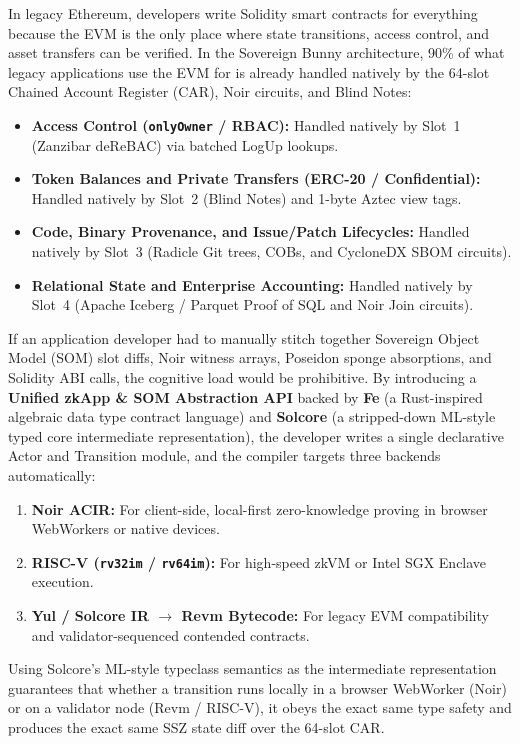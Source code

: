 \documentclass[a4paper,11pt,twoside,parskip=half-,headings=small]{scrartcl}
\newcommand{\code}[1]{\texttt{#1}}
\begin{document}
In legacy Ethereum, developers write Solidity smart contracts for everything because the EVM is the only place where state transitions, access control, and asset transfers can be verified. In the Sovereign Bunny architecture, 90\% of what legacy applications use the EVM for is already handled natively by the 64-slot Chained Account Register (CAR), Noir circuits, and Blind Notes:
\begin{itemize}[nosep]
  \item \textbf{Access Control (\code{onlyOwner} / RBAC):} Handled natively by Slot~1 (Zanzibar deReBAC) via batched LogUp lookups.
  \item \textbf{Token Balances and Private Transfers (ERC-20 / Confidential):} Handled natively by Slot~2 (Blind Notes) and 1-byte Aztec view tags.
  \item \textbf{Code, Binary Provenance, and Issue/Patch Lifecycles:} Handled natively by Slot~3 (Radicle Git trees, COBs, and CycloneDX SBOM circuits).
  \item \textbf{Relational State and Enterprise Accounting:} Handled natively by Slot~4 (Apache Iceberg / Parquet Proof of SQL and Noir Join circuits).
\end{itemize}
If an application developer had to manually stitch together Sovereign Object Model (SOM) slot diffs, Noir witness arrays, Poseidon sponge absorptions, and Solidity ABI calls, the cognitive load would be prohibitive. By introducing a \textbf{Unified zkApp \& SOM Abstraction API} backed by \textbf{Fe} (a Rust-inspired algebraic data type contract language) and \textbf{Solcore} (a stripped-down ML-style typed core intermediate representation), the developer writes a single declarative Actor and Transition module, and the compiler targets three backends automatically:
\begin{enumerate}[nosep]
  \item \textbf{Noir ACIR:} For client-side, local-first zero-knowledge proving in browser WebWorkers or native devices.
  \item \textbf{RISC-V (\code{rv32im} / \code{rv64im}):} For high-speed zkVM or Intel SGX Enclave execution.
  \item \textbf{Yul / Solcore IR $\to$ Revm Bytecode:} For legacy EVM compatibility and validator-sequenced contended contracts.
\end{enumerate}
Using Solcore's ML-style typeclass semantics as the intermediate representation guarantees that whether a transition runs locally in a browser WebWorker (Noir) or on a validator node (Revm / RISC-V), it obeys the exact same type safety and produces the exact same SSZ state diff over the 64-slot CAR.
\end{document}
